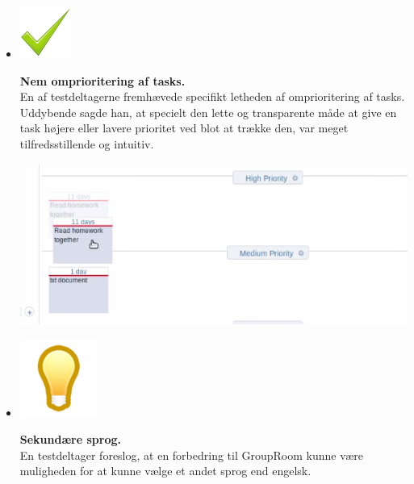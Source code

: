 \documentclass[12pt]{article}
\begin{document}
\begin{itemize}
   \item[]       \begin{minipage}{0.07\linewidth}
  \includegraphics[scale=0.4]{Billeder/godt}
          \end{minipage} \textbf{Nem omprioritering af tasks.}\\ En af testdeltagerne fremhævede specifikt letheden af omprioritering af tasks. Uddybende sagde han, at specielt den lette og transparente måde at give en task højere eller lavere prioritet ved blot at trække den, var meget tilfredsstillende og intuitiv.
      \begin{center}\includegraphics[scale=0.6]{Billeder/taskdrag}\end{center}


   \item[]       \begin{minipage}{0.07\linewidth}
  \includegraphics[scale=0.4]{Billeder/ide}
          \end{minipage} \textbf{Sekundære sprog.} \\En testdeltager foreslog, at en forbedring til GroupRoom kunne være muligheden for at kunne vælge et andet sprog end engelsk.
    

\end{itemize}
\end{document}
